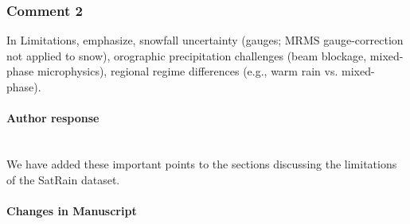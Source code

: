 \subsubsection*{Comment 2}

\rc

In Limitations, emphasize, snowfall uncertainty (gauges; MRMS
gauge-correction not applied to snow), orographic precipitation challenges (beam
blockage, mixed-phase microphysics), regional regime differences (e.g., warm
rain vs. mixed-phase).

\reply

\paragraph*{Author response} \\

We have added these important points to the sections discussing the limitations
of the SatRain dataset.

\paragraph*{Changes in Manuscript} \\

